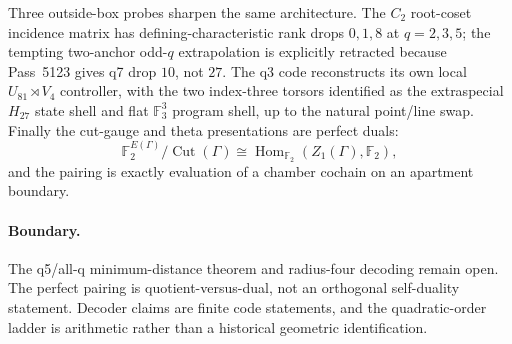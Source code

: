 Three outside-box probes sharpen the same architecture.  The $C_2$ root-coset incidence matrix has defining-characteristic rank drops $0,1,8$ at $q=2,3,5$; the tempting two-anchor odd-$q$ extrapolation is explicitly retracted because Pass~5123 gives q7 drop $10$, not $27$.  The q3 code reconstructs its own local $U_{81}\rtimes V_4$ controller, with the two index-three torsors identified as the extraspecial $H_{27}$ state shell and flat $\mathbb F_3^3$ program shell, up to the natural point/line swap.  Finally the cut-gauge and theta presentations are perfect duals:
\[
 \mathbb F_2^{E(\Gamma)}/\operatorname{Cut}(\Gamma)
 \cong
 \operatorname{Hom}_{\mathbb F_2}(Z_1(\Gamma),\mathbb F_2),
\]
and the pairing is exactly evaluation of a chamber cochain on an apartment boundary.

\paragraph{Boundary.}
The q5/all-q minimum-distance theorem and radius-four decoding remain open.  The perfect pairing is quotient-versus-dual, not an orthogonal self-duality statement.  Decoder claims are finite code statements, and the quadratic-order ladder is arithmetic rather than a historical geometric identification.
\fi
%
